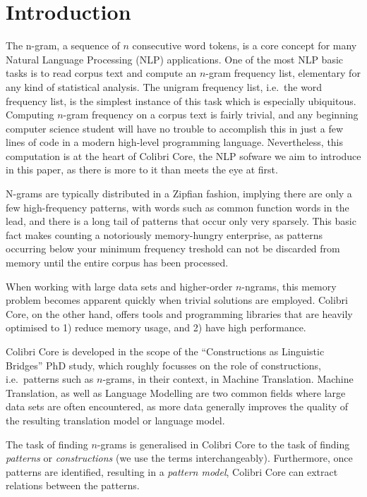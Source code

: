 



\section{Introduction}

The n-gram, a sequence of $n$ consecutive word tokens, is a core concept for
many Natural Language Processing (NLP) applications. One of the most NLP basic
tasks is to read corpus text and compute an $n$-gram frequency list, elementary
for any kind of statistical analysis. The unigram frequency list, i.e.\ the word
frequency list, is the simplest instance of this task which is especially
ubiquitous. Computing $n$-gram frequency on a corpus text is fairly trivial,
and any beginning computer science student will have no trouble to accomplish
this in just a few lines of code in a modern high-level programming language.
Nevertheless, this computation is at the heart of Colibri Core, the NLP sofware
we aim to introduce in this paper, as there is more to it than meets the eye at
first.

N-grams are typically distributed in a Zipfian fashion, implying there are only
a few high-frequency patterns, with words such as common function words in the
lead, and there is a long tail of patterns that occur only very sparsely. This
basic fact makes counting a notoriously memory-hungry enterprise, as patterns
occurring below your minimum frequency treshold can not be discarded from
memory until the entire corpus has been processed. 

When working with large data sets and higher-order $n$-ngrams, this memory
problem becomes apparent quickly when trivial solutions are employed. Colibri
Core, on the other hand, offers tools and programming libraries that are
heavily optimised to 1) reduce memory usage, and 2) have high performance.

Colibri Core is developed in the scope of the ``Constructions as Linguistic
Bridges'' PhD study, which roughly focusses on the role of constructions, i.e.\ 
patterns such as $n$-grams, in their context, in Machine Translation. Machine
Translation, as well as Language Modelling are two common fields where large
data sets are often encountered, as more data generally improves the quality of
the resulting translation model or language model. 


The task of finding $n$-grams is generalised in Colibri Core to the task of
finding \emph{patterns} or \emph{constructions} (we use the terms
interchangeably). Furthermore, once patterns are identified, resulting in a
\emph{pattern model}, Colibri Core can extract relations between the patterns.

